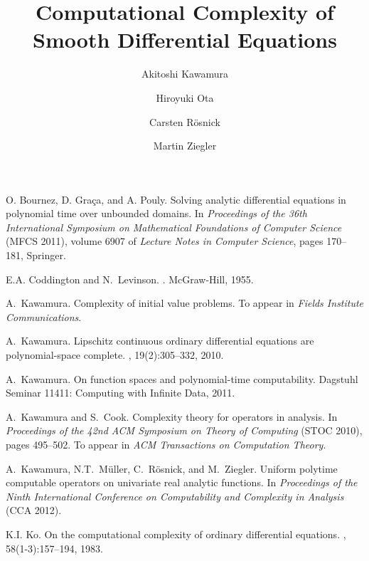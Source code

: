 \documentclass[envcountsame]{llncs}
\title{Computational Complexity of\\Smooth Differential Equations}
\author{%
Akitoshi Kawamura\inst{1}
\and
Hiroyuki Ota\inst{1}
\and
Carsten R\"osnick\inst{2}
\and
Martin Ziegler\inst{2}
}
\institute{%
University of Tokyo,  Tokyo, Japan\\
\and
Technische Universit\"at Darmstadt, Darmstadt, Germany}
\begin{document}
\maketitle








% 
% 

\begin{thebibliography}{10}
O. Bournez, D. Gra{\c c}a, and A. Pouly.
\newblock Solving analytic differential equations in polynomial time over
  unbounded domains.
\newblock In {\em Proceedings of the 36th International Symposium on 
Mathematical Foundations of Computer Science} (MFCS 2011), 
volume 6907 of {\em Lecture Notes in Computer Science}, 
pages 170--181, Springer.

E.A. Coddington and N.~Levinson.
.
\newblock McGraw-Hill, 1955.

A.~Kawamura.
\newblock Complexity of initial value problems.
\newblock To appear in {\em Fields Institute Communications}.

A.~Kawamura.
\newblock Lipschitz continuous ordinary differential equations are
  polynomial-space complete.
, 19(2):305--332, 2010.

A.~Kawamura.
\newblock On function spaces and polynomial-time computability.
\newblock Dagstuhl Seminar 11411: Computing with Infinite Data, 2011.

A.~Kawamura and S.~Cook.
\newblock Complexity theory for operators in analysis.
\newblock In {\em Proceedings of the 42nd ACM Symposium on 
Theory of Computing} (STOC 2010), pages 495--502.
\newblock To appear in {\em ACM Transactions on Computation Theory}.

A.~Kawamura, N.T.~M{\"u}ller, C.~R{\"o}snick, and M.~Ziegler.
\newblock Uniform polytime computable operators on univariate real analytic
  functions.
\newblock In {\em Proceedings of the Ninth International Conference on
  Computability and Complexity in Analysis} (CCA 2012).

K.I. Ko.
\newblock On the computational complexity of ordinary differential equations.
, 58(1-3):157--194, 1983.


\end{thebibliography}
\end{document}
